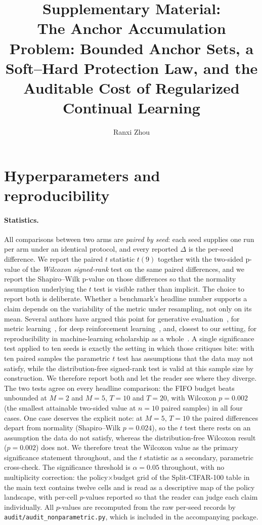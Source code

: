 \documentclass[11pt]{article}
\title{Supplementary Material:\\
The Anchor Accumulation Problem: Bounded Anchor Sets, a Soft--Hard
Protection Law, and the Auditable Cost of Regularized Continual
Learning}
\author{Ranxi Zhou}
\date{}
\begin{document}
\maketitle

\appendix

\section{Hyperparameters and reproducibility}
\label{appx:hyper}

\paragraph{Statistics.}
All comparisons between two arms are \emph{paired by seed}: each seed
supplies one run per arm under an identical protocol, and every reported
$\Delta$ is the per-seed difference. We report the paired $t$ statistic
$t(9)$ together with the two-sided p-value of the \emph{Wilcoxon
signed-rank} test on the same paired differences, and we report the
Shapiro--Wilk p-value on those differences so that the normality
assumption underlying the $t$ test is visible rather than implicit.
The choice to report both is deliberate. Whether a benchmark's headline
number supports a claim depends on the variability of the metric under
resampling, not only on its mean. Several authors have argued this point
for generative evaluation~\cite{lucic2018,melis2018}, for metric
learning~\cite{musgrave2020}, for deep reinforcement
learning~\cite{agarwal2021}, and, closest to our setting, for
reproducibility in machine-learning scholarship as a
whole~\cite{lipton2019}. A single significance test applied to ten
seeds is exactly the setting in which those critiques bite: with ten
paired samples the parametric $t$ test has assumptions that the data
may not satisfy, while the distribution-free signed-rank test is
valid at this sample size by construction. We therefore report both
and let the reader see where they diverge.
The two tests agree on every headline comparison: the FIFO budget beats
unbounded at $M{=}2$ and $M{=}5$, $T{=}10$ and $T{=}20$, with
Wilcoxon $p{=}0.002$ (the smallest attainable two-sided value at
$n{=}10$ paired samples) in all four cases. One case deserves the
explicit note: at $M{=}5$, $T{=}10$ the paired differences depart
from normality (Shapiro--Wilk $p{=}0.024$), so the $t$ test there
rests on an assumption the data do not satisfy, whereas the
distribution-free Wilcoxon result ($p{=}0.002$) does not. We therefore
treat the Wilcoxon value as the primary significance statement
throughout, and the $t$ statistic as a secondary, parametric
cross-check. The significance threshold is $\alpha{=}0.05$ throughout,
with no multiplicity correction: the policy$\times$budget grid of the
Split-CIFAR-100 table in the main text contains twelve cells and is
read as a descriptive map of the policy landscape, with per-cell
$p$-values reported so that the reader can judge each claim
individually. All $p$-values are recomputed from the raw per-seed
records by \texttt{audit/audit\_nonparametric.py}, which is included in
the accompanying package.
\end{document}

